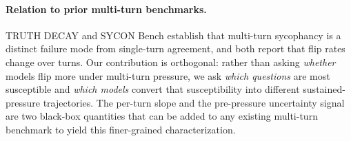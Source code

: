 \paragraph{Relation to prior multi-turn benchmarks.}
TRUTH DECAY \citep{liu2025truthdecayquantifyingmultiturn} and SYCON
Bench \cite{hong2025syconbench} establish that multi-turn sycophancy
is a distinct failure mode from single-turn agreement, and both report
that flip rates change over turns.
Our contribution is orthogonal: rather than asking \emph{whether}
models flip more under multi-turn pressure, we ask \emph{which
questions} are most susceptible and \emph{which models} convert that
susceptibility into different sustained-pressure trajectories.
The per-turn slope and the pre-pressure uncertainty signal are two
black-box quantities that can be added to any existing multi-turn
benchmark to yield this finer-grained characterization.
